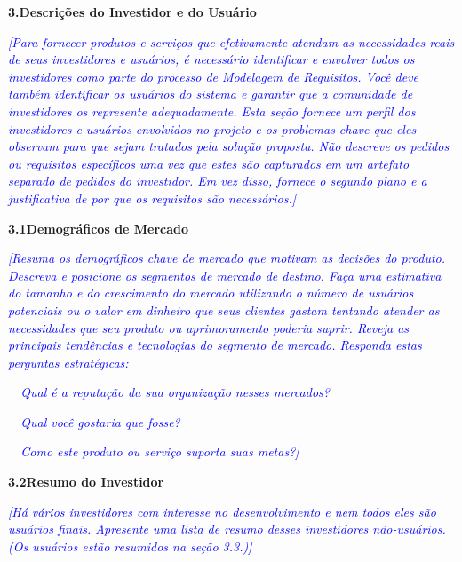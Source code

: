 \documentclass[a4paper]{article}
\begin{document}
\hypertarget{3senbrel00q1}{}\textbf{3.Descri\c{c}\~oes do Investidor e do Usu\'ario}

\textit{\textcolor{blue}{[Para fornecer produtos e servi\c{c}os que efetivamente atendam as necessidades reais de seus
investidores e usu\'arios, \'e necess\'ario identificar e envolver todos os investidores como parte do processo de
Modelagem de Requisitos. Voc\^e deve tamb\'em identificar os usu\'arios do sistema e garantir que a comunidade de
investidores os represente adequadamente. Esta se\c{c}\~ao fornece um perfil dos investidores e usu\'arios envolvidos
no projeto e os problemas chave que eles observam para que sejam tratados pela solu\c{c}\~ao proposta. N\~ao descreve
os pedidos ou requisitos espec\'ificos uma vez que estes s\~ao capturados em um artefato separado de pedidos do
investidor. Em vez disso, fornece o segundo plano e a justificativa de por que os requisitos s\~ao necess\'arios.]}}

\hypertarget{p0ns12v6bh5j}{}\textbf{3.1Demogr\'aficos de Mercado}

\textit{\textcolor{blue}{[Resuma os demogr\'aficos chave de mercado que motivam as decis\~oes do produto. Descreva e
posicione os segmentos de mercado de destino. Fa\c{c}a uma estimativa do tamanho e do crescimento do mercado utilizando
o n\'umero de usu\'arios potenciais ou o valor em dinheiro que seus clientes gastam tentando atender as necessidades
que seu produto ou aprimoramento poderia suprir. Reveja as principais tend\^encias e tecnologias do segmento de
mercado. Responda estas perguntas estrat\'egicas:}}

\textcolor{blue}{{\textbullet} }\textit{\textcolor{blue}{\ \ Qual \'e a reputa\c{c}\~ao da sua organiza\c{c}\~ao nesses
mercados?}}

\textcolor{blue}{{\textbullet}}\textit{\textcolor{blue}{\ \ Qual voc\^e gostaria que fosse?}}

\textcolor{blue}{{\textbullet} }\textit{\textcolor{blue}{\ \ Como este produto ou servi\c{c}o suporta suas metas?]}}

\hypertarget{n8gm6kj3eezs}{}\textbf{3.2Resumo do Investidor}

\textit{\textcolor{blue}{[H\'a v\'arios investidores com interesse no desenvolvimento e nem todos eles s\~ao usu\'arios
finais. Apresente uma lista de resumo desses investidores n\~ao-usu\'arios. (Os usu\'arios est\~ao resumidos na
se\c{c}\~ao 3.3.)]}}


\bigskip


\bigskip
\end{document}
